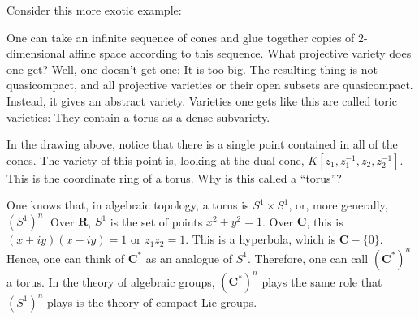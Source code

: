\documentclass [11 pt, oneside] {article}
\begin{document}
Consider this more exotic example:
\begin{center}
\end{center}
One can take an infinite sequence of cones and glue together copies of $2$-dimensional affine space according to this sequence. What projective variety does one get? Well, one doesn't get one: It is too big. The resulting thing is not quasicompact, and all projective varieties or their open subsets are quasicompact. Instead, it gives an abstract variety. Varieties one gets like this are called toric varieties: They contain a torus as a dense subvariety.

In the drawing above, notice that there is a single point contained in all of the cones. The variety of this point is, looking at the dual cone, $K[z_1,z_1^{-1},z_2,z_2^{-1}]$. This is the coordinate ring of a torus. Why is this called a ``torus''?

One knows that, in algebraic topology, a torus is $S^1\times S^1$, or, more generally, $(S^1)^n$. Over $\mathbf{R}$, $S^1$ is the set of points $x^2 + y^2 = 1$. Over $\mathbf{C}$, this is $(x+iy) (x-iy)=1$ or $z_1z_2=1$. This is a hyperbola, which is $\mathbf{C}-\{0\}$. Hence, one can think of $\mathbf{C}^*$ as an analogue of $S^1$. Therefore, one can call $(\mathbf{C}^*)^n$ a torus. In the theory of algebraic groups, $(\mathbf{C}^*)^n$ plays the same role that $(S^1)^n$ plays is the theory of compact Lie groups. 
\end{document}
